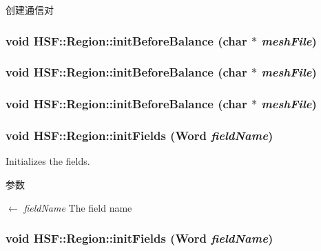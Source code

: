创建通信对 \hypertarget{classHSF_1_1Region_a9c38c5fc0d2fa5680eda4ab6a6933e4f}{
\subsubsection[{initBeforeBalance}]{\setlength{\rightskip}{0pt plus 5cm}void HSF::Region::initBeforeBalance (char $\ast$ {\em meshFile})}}
\label{classHSF_1_1Region_a9c38c5fc0d2fa5680eda4ab6a6933e4f}
\hypertarget{classHSF_1_1Region_a9c38c5fc0d2fa5680eda4ab6a6933e4f}{
\subsubsection[{initBeforeBalance}]{\setlength{\rightskip}{0pt plus 5cm}void HSF::Region::initBeforeBalance (char $\ast$ {\em meshFile})}}
\label{classHSF_1_1Region_a9c38c5fc0d2fa5680eda4ab6a6933e4f}
\hypertarget{classHSF_1_1Region_a9c38c5fc0d2fa5680eda4ab6a6933e4f}{
\subsubsection[{initBeforeBalance}]{\setlength{\rightskip}{0pt plus 5cm}void HSF::Region::initBeforeBalance (char $\ast$ {\em meshFile})}}
\label{classHSF_1_1Region_a9c38c5fc0d2fa5680eda4ab6a6933e4f}
\hypertarget{classHSF_1_1Region_a04109e318bad70575bf6aa0f810913bf}{
\subsubsection[{initFields}]{\setlength{\rightskip}{0pt plus 5cm}void HSF::Region::initFields (Word {\em fieldName})}}
\label{classHSF_1_1Region_a04109e318bad70575bf6aa0f810913bf}


Initializes the fields. 
\begin{DoxyParams}{参数}
\item[\mbox{$\leftarrow$} {\em fieldName}]The field name \end{DoxyParams}
\hypertarget{classHSF_1_1Region_a04109e318bad70575bf6aa0f810913bf}{
\subsubsection[{initFields}]{\setlength{\rightskip}{0pt plus 5cm}void HSF::Region::initFields (Word {\em fieldName})}}
\label{classHSF_1_1Region_a04109e318bad70575bf6aa0f810913bf}


